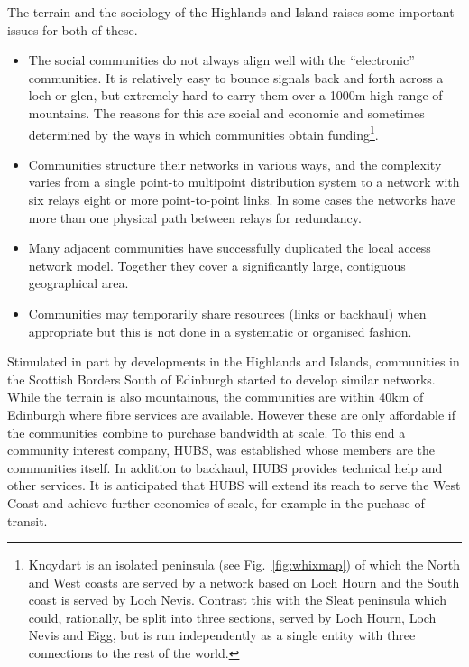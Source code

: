 The terrain and the sociology of the Highlands and Island raises some important issues for both of these.
\begin{itemize} 
\item The social communities do not always align well with the ``electronic'' communities. It is relatively easy to bounce signals back and forth across a loch or glen, but extremely hard to carry them over a 1000m high range of mountains. The reasons for this are social and economic and sometimes determined by the ways in which communities obtain funding\footnote{Knoydart is an isolated peninsula (see Fig.~\ref{fig:whixmap})  of which the North and West coasts are served by a network based on Loch Hourn and the South coast is served by Loch Nevis.  Contrast this with the Sleat peninsula which could, rationally,  be split into three sections, served by Loch Hourn, Loch Nevis and Eigg, but is run independently as a single entity with three connections to the rest of the world.}.
\item Communities structure their networks in various ways, and the complexity varies from a single point-to multipoint distribution system to a network with six relays  eight or more point-to-point links.  In some cases the networks have more than one physical path between relays for redundancy.
\item Many adjacent communities have successfully duplicated the local access network model. Together they cover a significantly large, contiguous geographical area. 
\item Communities may temporarily share resources (links or backhaul) when appropriate but this is not done in a systematic or organised fashion.
\end{itemize}
Stimulated in part by developments in the Highlands and Islands, communities in the Scottish Borders South of Edinburgh started  to develop similar networks.  While the terrain is also mountainous, the communities are within 40km of Edinburgh where fibre services are available.   However these are only affordable if the communities combine to purchase bandwidth at scale. To this end a community interest company, HUBS, was established whose members are the communities itself.  In addition to backhaul, HUBS provides technical help and other services.  It is anticipated that HUBS will extend its reach to serve the West Coast and achieve further economies of scale, for example in the puchase of transit.
